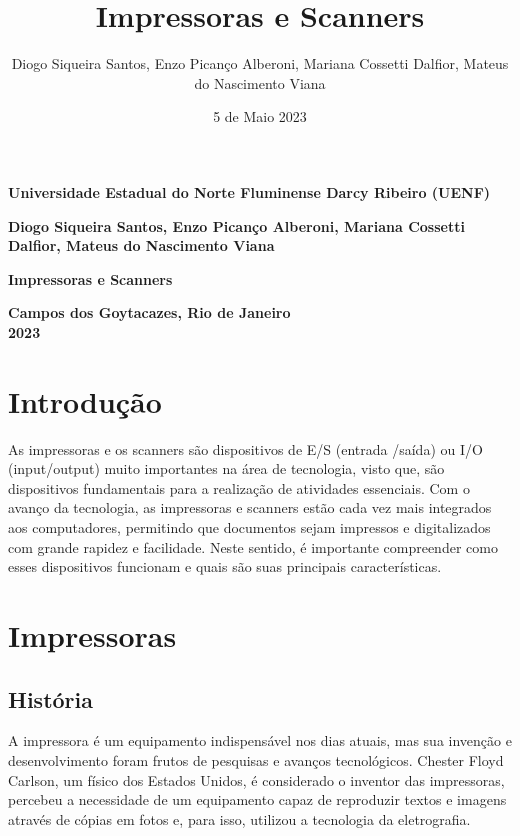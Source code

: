 \documentclass[12pt,a4, oneside, brazil]{article}
\title{Impressoras e Scanners}
\author{Diogo Siqueira Santos, Enzo Picanço Alberoni, Mariana Cossetti Dalfior, Mateus do Nascimento Viana}
\date{5 de Maio 2023}
\begin{document}
	\thispagestyle{empty}
	
	\begin{center}
	
		\Large \textbf{Universidade Estadual do Norte Fluminense Darcy Ribeiro (UENF)}
		\vspace{3cm}
		
		\Large \textbf{Diogo Siqueira Santos, Enzo Picanço Alberoni, Mariana Cossetti Dalfior, Mateus do Nascimento Viana}
		\vspace{7cm}
		
		\Large \textbf{\textbf{Impressoras e Scanners}}
	\end{center}

	\begin{center}
		\vspace{7cm}
		\textbf{Campos dos Goytacazes, Rio de Janeiro \\ 2023}
	\end{center}

\newpage

	\nocite{Tanenbaum2013}
	\nocite{Suprivix2022}
	\nocite{Silva2015}
	\nocite{Copygreen2022}
	 
	\section{Introdução}
	As impressoras e os scanners são dispositivos de E/S (entrada /saída) ou I/O (input/output) muito importantes na área de tecnologia, visto que, são dispositivos fundamentais para a realização de atividades essenciais. Com o avanço da tecnologia, as impressoras e scanners estão cada vez mais integrados aos computadores, permitindo que documentos sejam impressos e digitalizados com grande rapidez e facilidade. Neste sentido, é importante compreender como esses dispositivos funcionam e quais são suas principais características.	
	
	\section{Impressoras}
		\subsection{História}
		A impressora é um equipamento indispensável nos dias atuais, mas sua invenção e desenvolvimento foram frutos de pesquisas e avanços tecnológicos. Chester Floyd Carlson, um físico dos Estados Unidos, é considerado o inventor das impressoras, percebeu a necessidade de um equipamento capaz de reproduzir textos e imagens através de cópias em fotos e, para isso, utilizou a tecnologia da eletrografia. 
		
\end{document}
